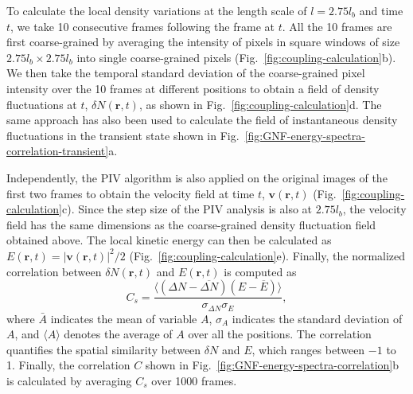 To calculate the local density variations at the length scale of $l = 2.75l_b$ and time $t$, we take 10 consecutive frames following the frame at $t$. All the 10 frames are first coarse-grained by averaging the intensity of pixels in square windows of size $2.75l_b \times 2.75l_b$ into single coarse-grained pixels (Fig.~\ref{fig:coupling-calculation}b). We then take the temporal standard deviation of the coarse-grained pixel intensity over the 10 frames at different positions to obtain a field of density fluctuations at $t$, $\delta N(\bm{r},t)$, as shown in Fig.~\ref{fig:coupling-calculation}d. The same approach has also been used to calculate the field of instantaneous density fluctuations in the transient state shown in Fig.~\ref{fig:GNF-energy-spectra-correlation-transient}a.

Independently, the PIV algorithm is also applied on the original images of the first two frames to obtain the velocity field at time $t$, $\bm{v}(\bm{r},t)$ (Fig.~\ref{fig:coupling-calculation}c). Since the step size of the PIV analysis is also at $2.75l_b$, the velocity field has the same dimensions as the coarse-grained density fluctuation field obtained above. The local kinetic energy can then be calculated as $E(\bm{r},t)=|\bm{v}(\bm{r},t)|^2/2$ (Fig.~\ref{fig:coupling-calculation}e). Finally, the normalized correlation between $\delta N(\bm{r},t)$ and $E(\bm{r},t)$ is computed as
\begin{equation}
C_s = \frac{\langle(\Delta N-\overline{\Delta N})(E-\overline{E})\rangle}{\sigma_{\Delta N}\sigma_{E}},
\end{equation}
where $\bar A$ indicates the mean of variable $A$, $\sigma_A$ indicates the standard deviation of $A$, and $\langle A \rangle$ denotes the average of $A$ over all the positions. The correlation quantifies the spatial similarity between $\delta N$ and $E$, which ranges between $-1$ to 1. Finally, the correlation $C$ shown in Fig.~\ref{fig:GNF-energy-spectra-correlation}b is calculated by averaging $C_s$ over 1000 frames.

